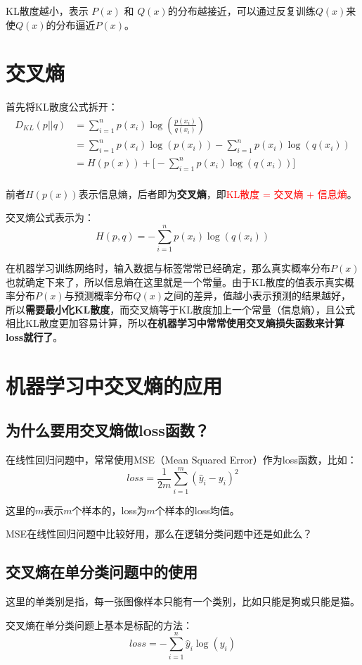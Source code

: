 \documentclass[12pt]{article}
\begin{document}
KL散度越小，表示 $P(x)$ 和 $Q(x)$的分布越接近，可以通过反复训练$Q(x)$来使$Q(x)$的分布逼近$P(x)$。

\section{交叉熵}
首先将KL散度公式拆开：
\begin{align}
D_{KL}(p||q) &= \sum_{i=1}^np(x_i)\log{(\frac{p(x_i)}{q(x_i)})} \\
&= \sum_{i=1}^np(x_i)\log(p(x_i)) - \sum_{i=1}^np(x_i)\log(q(x_i)) \\
&= H(p(x)) + \big[-\sum_{i=1}^np(x_i)\log(q(x_i))\big] \\
\end{align}

前者$H(p(x))$表示信息熵，后者即为\textbf{交叉熵}，即\textcolor{red}{KL散度 = 交叉熵 + 信息熵}。

交叉熵公式表示为：
$$
H(p,q) = -\sum_{i=1}^np(x_i)\log(q(x_i))
$$

在机器学习训练网络时，输入数据与标签常常已经确定，那么真实概率分布$P(x)$也就确定下来了，所以信息熵在这里就是一个常量。由于KL散度的值表示真实概率分布$P(x)$与预测概率分布$Q(x)$之间的差异，值越小表示预测的结果越好，所以\textbf{需要最小化KL散度}，而交叉熵等于KL散度加上一个常量（信息熵），且公式相比KL散度更加容易计算，所以\textbf{在机器学习中常常使用交叉熵损失函数来计算loss就行了}。

\section{机器学习中交叉熵的应用\cite{CrossEntropy_Deep_Understanding}}
\subsection{为什么要用交叉熵做loss函数？}
在线性回归问题中，常常使用MSE（Mean Squared Error）作为loss函数，比如：
$$
loss = \frac{1}{2m}\sum_{i=1}^m(\hat y_i - y_i)^2
$$

这里的$m$表示$m$个样本的，loss为$m$个样本的loss均值。

MSE在线性回归问题中比较好用，那么在逻辑分类问题中还是如此么？

\subsection{交叉熵在单分类问题中的使用}
这里的单类别是指，每一张图像样本只能有一个类别，比如只能是狗或只能是猫。

交叉熵在单分类问题上基本是标配的方法：
$$
loss = -\sum_{i=1}^n{\hat y_i}\log(y_i)
$$
\end{document}
